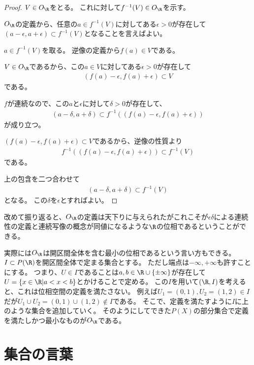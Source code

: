 \documentclass[uplatex]{jsarticle}
\begin{document}
\begin{proof}
  $V\in O_\R$をとる。
  これに対して$f^{-1}(V)\in O_\R$を示す。
  
  $O_\R$の定義から、任意の$a\in f^{-1}(V)$に対してある$\epsilon>0$が存在して$(a-\epsilon,a+\epsilon)\subset f^{-1}(V)$となることを言えばよい。
  
  $a\in f^{-1}(V)$を取る。
  逆像の定義から$f(a)\in V$である。
  
  $V\in O_\R$であるから、この$a\in V$に対してある$\epsilon>0$が存在して
  \begin{align*}
    (f(a)-\epsilon,f(a)+\epsilon)\subset V
  \end{align*}
  である。
  
  $f$が連続なので、この$a$と$\epsilon$に対して$\delta>0$が存在して、
  \begin{align*}
    (a-\delta,a+\delta)\subset f^{-1}((f(a)-\epsilon,f(a)+\epsilon))
  \end{align*}
  が成り立つ。

  $(f(a)-\epsilon,f(a)+\epsilon)\subset V$であるから、逆像の性質より
  \begin{align*}
    f^{-1}((f(a)-\epsilon,f(a)+\epsilon))\subset f^{-1}(V)
  \end{align*}
  である。
  
  上の包含を二つ合わせて
  \begin{align*}
    (a-\delta,a+\delta)\subset f^{-1}(V)
  \end{align*}
  となる。
  この$\delta$を$\epsilon$とすればよい。
\end{proof}

改めて振り返ると、$O_\R$の定義は天下りに与えられたがこれこそが$\epsilon\delta$による連続性の定義と連続写像の概念が同値になるような$\R$の位相であるということができる。

実際には$O_\R$は開区間全体を含む最小の位相であるという言い方もできる。
$I\subset P(\R)$を開区間全体で定まる集合とする。
ただし端点は$-\infty, +\infty$も許すことにする。
つまり、$U\in I$であることは$a,b\in\R\cup\{\pm\infty\}$が存在して$U=\{x\in\R\vert a<x<b\}$とかけることで定める。
この$I$を用いて$(\R,I)$を考えると、これは位相空間の定義を満たさない。
例えば$U_1=(0,1), U_2=(1,2)\in I$だが$U_1\cup U_2=(0,1)\cup(1,2)\notin I$である。
そこで、定義を満たすように$I$に上のような集合を追加していく。
そのようにしてできた$P(X)$の部分集合で定義を満たしかつ最小なものが$O_\R$である。

\section{集合の言葉}
\end{document}
